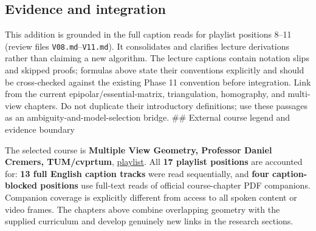 \subsection{Evidence and integration}\label{02-foundations-ii-ch039-evidence-and-integration}

This addition is grounded in the full caption reads for playlist positions 8--11 (review files \texttt{V08.md}--\texttt{V11.md}). It consolidates and clarifies lecture derivations rather than claiming a new algorithm. The lecture captions contain notation slips and skipped proofs; formulas above state their conventions explicitly and should be cross-checked against the existing Phase 11 convention before integration. Link from the current epipolar/essential-matrix, triangulation, homography, and multi-view chapters. Do not duplicate their introductory definitions; use these passages as an ambiguity-and-model-selection bridge. \#\# External course legend and evidence boundary

The selected course is \textbf{Multiple View Geometry, Professor Daniel Cremers, TUM/cvprtum}, \href{https://www.youtube.com/playlist?list=PLTBdjV_4f-EJn6udZ34tht9EVIW7lbeo4}{playlist}. All \textbf{17 playlist positions} are accounted for: \textbf{13 full English caption tracks} were read sequentially, and \textbf{four caption-blocked positions} use full-text reads of official course-chapter PDF companions. Companion coverage is explicitly different from access to all spoken content or video frames. The chapters above combine overlapping geometry with the supplied curriculum and develop genuinely new links in the research sections.

